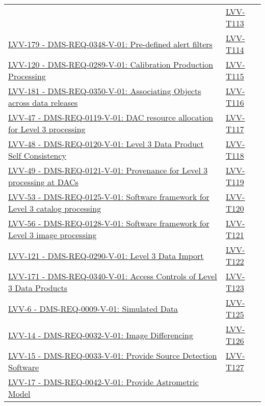 {\begin{longtable}[]{p{13cm}p{3cm}}
& {
\hyperref[lvv-t113]{LVV-T113}
} \\
\href{https://jira.lsstcorp.org/browse/LVV-179}{LVV-179 - DMS-REQ-0348-V-01: Pre-defined alert filters}
& {
\hyperref[lvv-t114]{LVV-T114}
} \\
\href{https://jira.lsstcorp.org/browse/LVV-120}{LVV-120 - DMS-REQ-0289-V-01: Calibration Production Processing}
& {
\hyperref[lvv-t115]{LVV-T115}
} \\
\href{https://jira.lsstcorp.org/browse/LVV-181}{LVV-181 - DMS-REQ-0350-V-01: Associating Objects across data releases}
& {
\hyperref[lvv-t116]{LVV-T116}
} \\
\href{https://jira.lsstcorp.org/browse/LVV-47}{LVV-47 - DMS-REQ-0119-V-01: DAC resource allocation for Level 3 processing}
& {
\hyperref[lvv-t117]{LVV-T117}
} \\
\href{https://jira.lsstcorp.org/browse/LVV-48}{LVV-48 - DMS-REQ-0120-V-01: Level 3 Data Product Self Consistency}
& {
\hyperref[lvv-t118]{LVV-T118}
} \\
\href{https://jira.lsstcorp.org/browse/LVV-49}{LVV-49 - DMS-REQ-0121-V-01: Provenance for Level 3 processing at DACs}
& {
\hyperref[lvv-t119]{LVV-T119}
} \\
\href{https://jira.lsstcorp.org/browse/LVV-53}{LVV-53 - DMS-REQ-0125-V-01: Software framework for Level 3 catalog processing}
& {
\hyperref[lvv-t120]{LVV-T120}
} \\
\href{https://jira.lsstcorp.org/browse/LVV-56}{LVV-56 - DMS-REQ-0128-V-01: Software framework for Level 3 image processing}
& {
\hyperref[lvv-t121]{LVV-T121}
} \\
\href{https://jira.lsstcorp.org/browse/LVV-121}{LVV-121 - DMS-REQ-0290-V-01: Level 3 Data Import}
& {
\hyperref[lvv-t122]{LVV-T122}
} \\
\href{https://jira.lsstcorp.org/browse/LVV-171}{LVV-171 - DMS-REQ-0340-V-01: Access Controls of Level 3 Data Products}
& {
\hyperref[lvv-t123]{LVV-T123}
} \\
\href{https://jira.lsstcorp.org/browse/LVV-6}{LVV-6 - DMS-REQ-0009-V-01: Simulated Data}
& {
\hyperref[lvv-t125]{LVV-T125}
} \\
\href{https://jira.lsstcorp.org/browse/LVV-14}{LVV-14 - DMS-REQ-0032-V-01: Image Differencing}
& {
\hyperref[lvv-t126]{LVV-T126}
} \\
\href{https://jira.lsstcorp.org/browse/LVV-15}{LVV-15 - DMS-REQ-0033-V-01: Provide Source Detection Software}
& {
\hyperref[lvv-t127]{LVV-T127}
} \\
\href{https://jira.lsstcorp.org/browse/LVV-17}{LVV-17 - DMS-REQ-0042-V-01: Provide Astrometric Model}

\end{longtable}}
